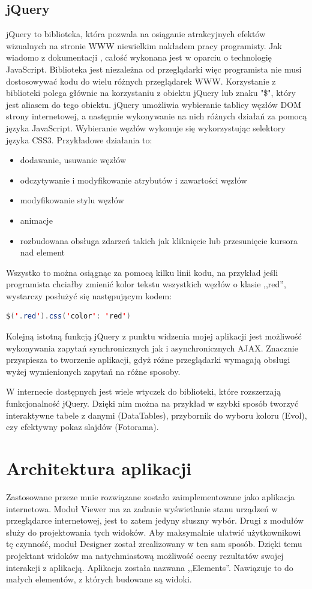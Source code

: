 \subsection{jQuery}
jQuery to biblioteka, która pozwala na osiąganie atrakcyjnych efektów wizualnych na stronie WWW niewielkim nakładem pracy programisty. Jak wiadomo z dokumentacji \cite{jquery-doc}, całość wykonana jest w oparciu o technologię JavaScript. Biblioteka jest niezależna od przeglądarki więc programista nie musi dostosowywać kodu do wielu różnych przeglądarek WWW. Korzystanie z biblioteki polega głównie na korzystaniu z obiektu jQuery lub znaku "\$", który jest aliasem do tego obiektu. jQuery umożliwia wybieranie tablicy węzłów DOM strony internetowej, a następnie wykonywanie na nich różnych działań za pomocą języka JavaScript. Wybieranie węzłów wykonuje się wykorzystując selektory języka CSS3. Przykładowe działania to:
\begin{itemize}
\item dodawanie, usuwanie węzłów
\item odczytywanie i modyfikowanie atrybutów i zawartości węzłów
\item modyfikowanie stylu węzłów
\item animacje
\item rozbudowana obsługa zdarzeń takich jak kliknięcie lub przesunięcie kursora nad element
\end{itemize}
Wszystko to można osiągnąc za pomocą kilku linii kodu, na przykład jeśli programista chciałby zmienić kolor tekstu wszystkich węzłów o klasie ,,red'', wystarczy posłużyć się następującym kodem:
\begin{lstlisting}[language=Java]
$('.red').css('color': 'red')
\end{lstlisting}
Kolejną istotną funkcją jQuery z punktu widzenia mojej aplikacji jest możliwość wykonywania zapytań synchronicznych jak i asynchronicznych AJAX. Znacznie przyspiesza to tworzenie aplikacji, gdyż różne przeglądarki wymagają obsługi wyżej wymienionych zapytań na różne sposoby. 

W internecie dostępnych jest wiele wtyczek do biblioteki, które rozszerzają funkcjonalność jQuery. Dzięki nim można na przykład w szybki sposób tworzyć interaktywne tabele z danymi (DataTables), przybornik do wyboru koloru (Evol), czy efektywny pokaz slajdów (Fotorama).

\section{Architektura aplikacji}
Zastosowane przeze mnie rozwiązane zostało zaimplementowane jako aplikacja internetowa. Moduł Viewer ma za zadanie wyświetlanie stanu urządzeń w przeglądarce internetowej, jest to zatem jedyny słuszny wybór. Drugi z modułów służy do projektowania tych widoków. Aby maksymalnie ułatwić użytkownikowi tę czynność, moduł Designer został zrealizowany w ten sam sposób. Dzięki temu projektant widoków ma natychmiastową możliwość oceny rezultatów swojej interakcji z aplikacją. Aplikacja została nazwana ,,Elements''. Nawiązuje to do małych elementów, z których budowane są widoki. 

